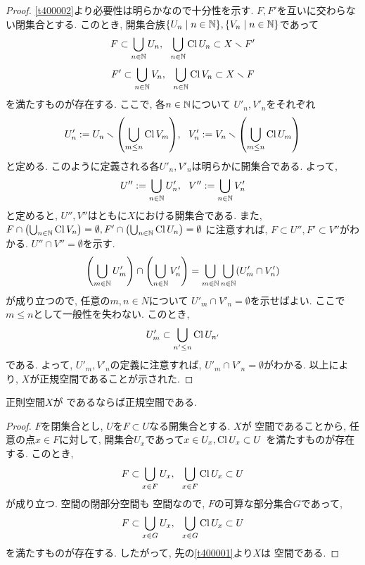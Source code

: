 \documentclass[uplatex, dvipdfmx, a4paper, 12pt, class=jsbook, crop=false]{standalone}
\begin{document}
\begin{proof}
	\cref{t400002}より必要性は明らかなので十分性を示す.
	\( F, F' \)を互いに交わらない閉集合とする.
	このとき, 開集合族\( \setcomp{U_n}{n \in \N},
	\setcomp{V_n}{n \in \N} \)であって
	\[ F \subset \bigcup_{n \in \mathbb{N}} U_n,
	\ \ \bigcup_{n \in \mathbb{N}} \mathop{\mathrm{Cl}}\nolimits U_n \subset X \smallsetminus F' \]
	\[ F' \subset \bigcup_{n \in \mathbb{N}} V_n,
	\ \ \bigcup_{n \in \mathbb{N}} \mathop{\mathrm{Cl}}\nolimits V_n \subset X \smallsetminus F \]
	を満たすものが存在する.
	ここで, 各\( n \in \mathbb{N} \)について
	\( U'_n, V'_n \)をそれぞれ
	\[ U'_n \defeq U_n \setminus \lrparen{\bigcup_{m \leq n} \topcl V_m},
	\ \ V'_n \defeq V_n \setminus \lrparen{\bigcup_{m \leq n} \topcl U_m} \]
	と定める.
	このように定義される各\( U'_n, V'_n \)は明らかに開集合である.
	よって,
	\[ U'' \mathrel{:=} \bigcup_{n \in \mathbb{N}} U'_n,
	\ \ V'' \mathrel{:=} \bigcup_{n \in \mathbb{N}} V'_n \]
	と定めると, \( U'', V'' \)はともに\( X \)における開集合である.
	また, \( F \cap \lrparen{\bigcup_{n \in \N} \topcl V_n}= \emptyset,
	F' \cap \lrparen{\bigcup_{n \in \N} \topcl U_n} = \emptyset \)
	に注意すれば, \( F \subset U'', F' \subset V'' \)がわかる.
	\( U'' \cap V'' = \emptyset \)を示す.
	\[ \lrparen{\bigcup_{m\in \N} U'_m}
	\cap \lrparen{\bigcup_{n\in \N} V'_n}
	= \bigcup_{m \in \N} \bigcup_{n \in \N} \lrparen{U'_m \cap V'_n} \]
	が成り立つので, 任意の\( m, n \in N \)について
	\( U'_m \cap V'_n = \emptyset \)を示せばよい.
	ここで\( m \leq n \)として一般性を失わない.
	このとき,
	\[ U'_m \subset \bigcup_{n' \leq n} \mathop{\mathrm{Cl}}\nolimits U_{n'} \]
	である.  よって, \( U'_m, V'_n \)の定義に注意すれば,
	\( U'_m \cap V'_n = \emptyset \)がわかる.
	以上により, \( X \)が正規空間であることが示された.
\end{proof}

\begin{theorem}
	正則空間\( X \)が \Lindelof であるならば正規空間である.
\end{theorem}

\begin{proof}
	\( F \)を閉集合とし, \( U \)を\( F \subset U \)なる開集合とする.
	\( X \)が  空間であることから,
	任意の点\( x \in F \)に対して,
	開集合\( U_x \)であって\( x \in U_x, \mathop{\mathrm{Cl}}\nolimits U_x \subset U \)
	を満たすものが存在する. このとき,
	\[ F \subset \bigcup_{x \in F} U_x,
	\ \ \bigcup_{x \in F} \mathop{\mathrm{Cl}}\nolimits U_x \subset U \]
	が成り立つ. \Lindelof 空間の閉部分空間も \Lindelof 空間なので,
	\( F \)の可算な部分集合\( G \)であって,
	\[  F \subset \bigcup_{x \in G} U_x,
	\ \ \bigcup_{x \in G} \mathop{\mathrm{Cl}}\nolimits U_x \subset U \]
	を満たすものが存在する.
	したがって, 先の\cref{t400001}より\( X \)は  空間である.
\end{proof}
\end{document}

